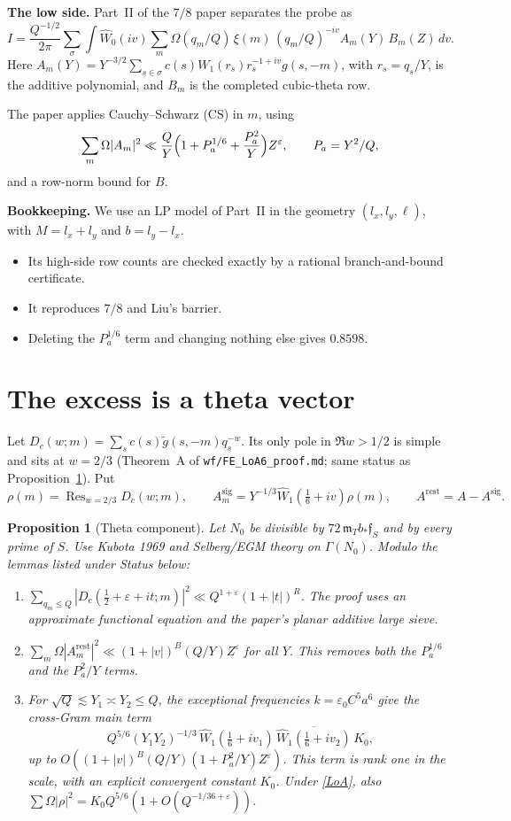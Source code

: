 \documentclass[11pt]{article}
\newtheorem{proposition}[theorem]{Proposition}
\theoremstyle{definition}
\theoremstyle{remark}
\newcommand{\eps}{\varepsilon}
\newcommand{\tg}{\widetilde{g}}
\newcommand{\Asig}{A^{\mathrm{sig}}}
\newcommand{\Arest}{A^{\mathrm{rest}}}
\begin{document}
\textbf{The low side.} Part~II of the $7/8$ paper separates the probe as
\[
I=\frac{Q^{-1/2}}{2\pi}\sum_\sigma\int\widehat W_0(iv)\sum_{m}\Omega(q_m/Q)\,\xi(m)\,(q_m/Q)^{-iv}A_m(Y)\,B_m(Z)\,dv .
\]
Here $A_m(Y)=Y^{-3/2}\sum_{s\in\sigma}c(s)W_1(r_s)r_s^{-1+iv}g(s,-m)$, with $r_s=q_s/Y$, is the additive polynomial, and $B_m$ is the completed cubic-theta row.

The paper applies Cauchy--Schwarz (CS) in $m$, using
\[
\sum_m\Omega|A_m|^2\ll\frac QY\Bigl(1+P_a^{1/6}+\frac{P_a^2}{Y}\Bigr)Z^\eps,
\qquad P_a=Y^2/Q,
\]
and a row-norm bound for $B$.

\textbf{Bookkeeping.} We use an LP model of Part~II in the geometry $(l_x,l_y,\ell)$, with $M=l_x+l_y$ and $b=l_y-l_x$.
\begin{itemize}[leftmargin=*]
\item Its high-side row counts are checked exactly by a rational branch-and-bound certificate.
\item It reproduces $7/8$ and Liu's barrier.
\item Deleting the $P_a^{1/6}$ term and changing nothing else gives $0.8598$.
\end{itemize}

\section{The excess is a theta vector}

Let $D_c(w;m)=\sum_s c(s)\tg(s,-m)q_s^{-w}$. Its only pole in $\Re w>1/2$ is simple and sits at $w=2/3$ (Theorem~A of \texttt{wf/FE\_LoA6\_proof.md}; same status as Proposition~\ref{prop:theta}). Put
\[
\rho(m)=\operatorname{Res}_{w=2/3}D_c(w;m),\qquad
\Asig_m=Y^{-1/3}\widehat W_1(\tfrac16+iv)\rho(m),\qquad
\Arest=A-\Asig.
\]

\begin{proposition}[Theta component]\label{prop:theta}
Let $N_0$ be divisible by $72\,\mathfrak m_Tb_*\mathfrak f_S$ and by every prime of $S$. Use Kubota 1969 and Selberg/EGM theory on $\Gamma(N_0)$. Modulo the lemmas listed under \emph{Status} below:
\begin{enumerate}[label=(\alph*)]
\item\label{LoA} $\sum_{q_m\le Q}|D_c(\tfrac12+\eps+it;m)|^2\ll Q^{1+\eps}(1+|t|)^{R}$. The proof uses an approximate functional equation and the paper's planar additive large sieve.
\item\label{clean} $\sum_m\Omega|\Arest_m|^2\ll(1+|v|)^{B}(Q/Y)Z^\eps$ for all $Y$. This removes both the $P_a^{1/6}$ and the $P_a^2/Y$ terms.
\item For $\sqrt Q\lesssim Y_1\asymp Y_2\le Q$, the exceptional frequencies $k=\eps_0C^5a^6$ give the cross-Gram main term
\[
Q^{5/6}(Y_1Y_2)^{-1/3}\,\widehat W_1(\tfrac16+iv_1)\,\overline{\widehat W_1(\tfrac16+iv_2)}\,K_0,
\]
up to $O((1+|v|)^B(Q/Y)(1+P_a^2/Y)Z^\eps)$. This term is rank one in the scale, with an explicit convergent constant $K_0$. Under \ref{LoA}, also $\sum\Omega|\rho|^2=K_0Q^{5/6}(1+O(Q^{-1/36+\eps}))$.
\end{enumerate}
\end{proposition}
\end{document}

